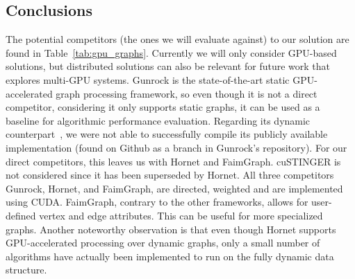     \subsection{Conclusions}
    The potential competitors (the ones we will evaluate against) to our solution are found in Table~\ref{tab:gpu_graphs}. Currently we will only consider \gls{GPU}-based solutions, but distributed solutions can also be relevant for future work that explores multi-\gls{GPU} systems. Gunrock is the state-of-the-art static \gls{GPU}-accelerated graph processing framework, so even though it is not a direct competitor, considering it only supports static graphs, it can be used as a baseline for algorithmic performance evaluation. Regarding its dynamic counterpart~\cite{paper:dynamic_graph_gpu}, we were not able to successfully compile its publicly available implementation (found on Github as a branch in Gunrock's repository). For our direct competitors, this leaves us with Hornet and FaimGraph. cuSTINGER is not considered since it has been superseded by Hornet. All three competitors Gunrock, Hornet, and FaimGraph, are directed, weighted and are implemented using \gls{CUDA}. FaimGraph, contrary to the other frameworks, allows for user-defined vertex and edge attributes. This can be useful for more specialized graphs. Another noteworthy observation is that even though Hornet supports \gls{GPU}-accelerated processing over dynamic graphs, only a small number of algorithms have actually been implemented to run on the fully dynamic data structure.









    